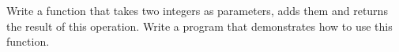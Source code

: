 Write a function that takes two integers as parameters, adds them and returns the result of this operation. Write a program that demonstrates how to use this function.
